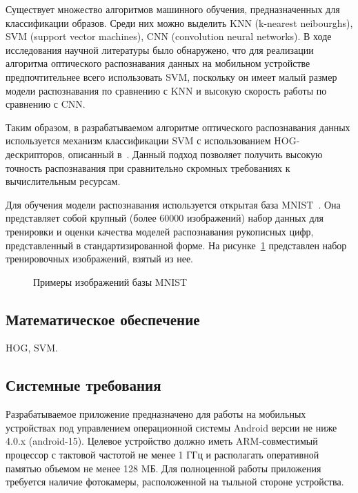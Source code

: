 Существует множество алгоритмов машинного обучения,
предназначенных для классификации образов.
Среди них можно выделить KNN (k-nearest neibourghs),
SVM (support vector machines), CNN (convolution neural networks).
В ходе исследования научной литературы было обнаружено, что
для реализации алгоритма оптического распознавания данных
на мобильном устройстве предпочтительнее всего использовать SVM,
поскольку он имеет малый размер модели распознавания по сравнению с KNN
и высокую скорость работы по сравнению с CNN.

Таким образом, в разрабатываемом алгоритме оптического распознавания данных
используется механизм классификации SVM с использованием HOG-дескрипторов,
описанный в~\cite{ebrahimzadeh14}.
Данный подход позволяет получить высокую точность распознавания
при сравнительно скромных требованиях к вычислительным ресурсам.

Для обучения модели распознавания используется открытая база MNIST~\cite{mnist}.
Она представляет собой крупный (более 60000 изображений) набор данных
для тренировки и оценки качества моделей распознавания рукописных цифр,
представленный в стандартизированной форме.
На рисунке~\ref{fig:design_algorithm_mnist} представлен набор
тренировочных изображений, взятый из нее.

\begin{figure}[h!]
  \centering
  \caption{Примеры изображений базы MNIST}
  \label{fig:design_algorithm_mnist}
\end{figure}

\subsection{Математическое обеспечение}

HOG, SVM.

\subsection{Системные требования}

Разрабатываемое приложение предназначено для работы на мобильных устройствах
под управлением операционной системы Android версии не ниже 4.0.x (android-15).
Целевое устройство должно иметь ARM-совместимый процессор с тактовой частотой не менее
1 ГГц и располагать оперативной памятью объемом не менее 128 MБ.
Для полноценной работы приложения требуется наличие фотокамеры,
расположенной на тыльной стороне устройства.

